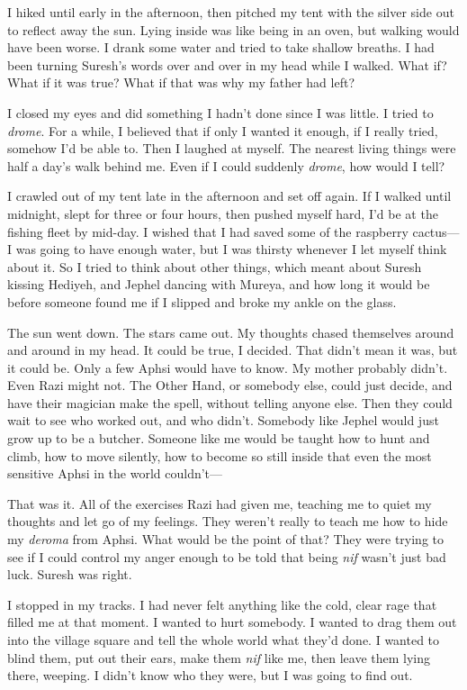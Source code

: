 I hiked until early in the afternoon, then pitched my tent with the
silver side out to reflect away the sun.  Lying inside was like being
in an oven, but walking would have been worse.  I drank some water and
tried to take shallow breaths.  I had been turning Suresh's words over
and over in my head while I walked.  What if?  What if it was true?
What if that was why my father had left?

I closed my eyes and did something I hadn't done since I was little.
I tried to \emph{drome}.  For a while, I believed that if only I wanted it
enough, if I really tried, somehow I'd be able to.  Then I laughed at
myself.  The nearest living things were half a day's walk behind me.
Even if I could suddenly \emph{drome}, how would I tell?

I crawled out of my tent late in the afternoon and set off again.  If
I walked until midnight, slept for three or four hours, then pushed
myself hard, I'd be at the fishing fleet by mid-day.  I wished that I
had saved some of the raspberry cactus---I was going to have enough
water, but I was thirsty whenever I let myself think about it.  So I
tried to think about other things, which meant about Suresh kissing
Hediyeh, and Jephel dancing with Mureya, and how long it would be
before someone found me if I slipped and broke my ankle on the glass.

The sun went down.  The stars came out.  My thoughts chased themselves
around and around in my head.  It could be true, I decided.  That
didn't mean it was, but it could be.  Only a few Aphsi would have to
know.  My mother probably didn't.  Even Razi might not.  The Other
Hand, or somebody else, could just decide, and have their magician
make the spell, without telling anyone else.  Then they could wait to
see who worked out, and who didn't.  Somebody like Jephel would just
grow up to be a butcher.  Someone like me would be taught how to hunt
and climb, how to move silently, how to become so still inside that
even the most sensitive Aphsi in the world couldn't---

That was it.  All of the exercises Razi had given me, teaching me to
quiet my thoughts and let go of my feelings.  They weren't really to
teach me how to hide my \emph{deroma} from Aphsi.  What would be the point
of that?  They were trying to see if I could control my anger enough
to be told that being \emph{nif} wasn't just bad luck.  Suresh was right.

I stopped in my tracks.  I had never felt anything like the cold,
clear rage that filled me at that moment.  I wanted to hurt somebody.
I wanted to drag them out into the village square and tell the whole
world what they'd done.  I wanted to blind them, put out their ears,
make them \emph{nif} like me, then leave them lying there, weeping.  I
didn't know who they were, but I was going to find out.

